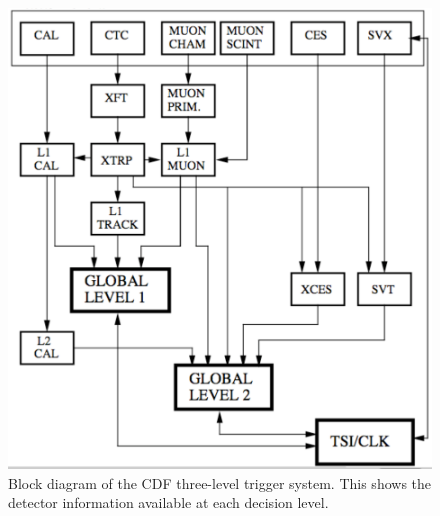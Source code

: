 \begin{figure}[p]
\begin{centering}
\includegraphics[scale=0.7]{CDFTriggerSystem_DetParts.pdf}
\caption{Block diagram of the CDF three-level trigger system. This shows the detector information available at each decision level.}%
\label{fig:TriggerSystemDetParts}
\end{centering}
\end{figure}

